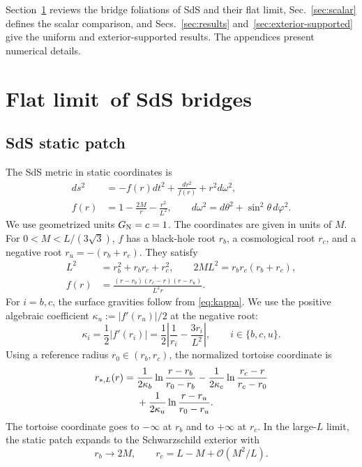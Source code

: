 \documentclass[
 aps,
 prd,
 reprint,
 superscriptaddress,
 nofootinbib,
 longbibliography
]{revtex4-2}
\begin{document}
Section~\ref{sec:bridges} reviews the bridge foliations of SdS and their flat limit, Sec.~\ref{sec:scalar} defines the scalar comparison, and Secs.~\ref{sec:results} and~\ref{sec:exterior-supported} give the uniform and exterior-supported results.  The appendices present numerical details.

\section{Flat limit of SdS bridges}
\label{sec:bridges}

\subsection{SdS static patch}

The SdS metric in static coordinates is
\begin{align}
 ds^2&=-f(r)dt^2+\frac{dr^2}{f(r)}+r^2d\omega^2,
 \label{eq:sds_metric}\\
 f(r)&=1-\frac{2M}{r}-\frac{r^2}{L^2},
 \qquad d\omega^2=d\theta^2+\sin^2\theta\,d\varphi^2.
 \label{eq:f}
\end{align}
We use geometrized units $G_{\rm N}=c=1$. The coordinates are given in units of $M$. For $0<M<L/(3\sqrt{3})$, $f$ has a black-hole root $r_b$, a cosmological root $r_c$, and a negative root $r_u=-(r_b+r_c)$.  They satisfy
\begin{align}
 L^2&=r_b^2+r_br_c+r_c^2, \qquad
 2ML^2=r_br_c(r_b+r_c),
 \label{eq:root_relations}\\
 f(r)&=\frac{(r-r_b)(r_c-r)(r-r_u)}{L^2r}.
 \label{eq:f_factorized}
\end{align}
For $i=b,c$, the surface gravities follow from
\eqref{eq:kappa}.  We use the positive algebraic coefficient $\kappa_u:=|f'(r_u)|/2$ at the negative root:
\begin{equation}
 \kappa_i=\frac12\left|f'(r_i)\right|
 =\frac12\left|\frac{1}{r_i}-\frac{3r_i}{L^2}\right|,
 \qquad i\in\{b,c,u\}.
 \label{eq:kappa}
\end{equation}
Using a reference radius $r_0\in(r_b,r_c)$, the normalized
tortoise coordinate is
\begin{align}
r_{*,L}(r)={}&\frac{1}{2\kappa_b}
 \ln\frac{r-r_b}{r_0-r_b}
-\frac{1}{2\kappa_c}
 \ln\frac{r_c-r}{r_c-r_0}
\notag\\
&+\frac{1}{2\kappa_u}
 \ln\frac{r-r_u}{r_0-r_u}.
\label{eq:tortoise}
\end{align}
The tortoise coordinate goes to $-\infty$ at $r_b$ and to $+\infty$ at
$r_c$.  In the large-$L$ limit, the static patch expands to the Schwarzschild exterior \cite{ZhouPanossoMacedo:2025} with
\begin{equation}
 r_b\to2M,\qquad r_c=L-M+\mathcal{O}(M^2/L).
 \label{eq:horizon_flat_limit}
\end{equation}
\end{document}
